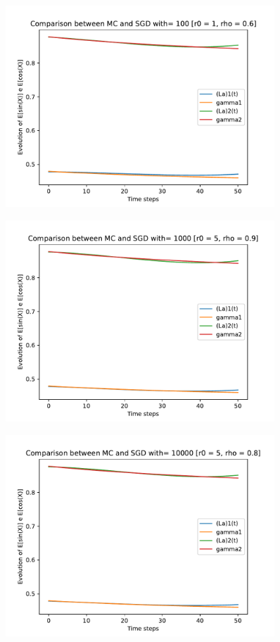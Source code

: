\documentclass[a4paper,11pt,openright]{report}
\begin{document}
\begin{figure}[H]
\centering
\includegraphics[width=0.9\textwidth]{images/graphics T = 0.5/n = 3, M = 100 sine and cosine.pdf}
\end{figure}
\begin{figure}[H]
\centering
\includegraphics[width=0.9\textwidth]{images/graphics T = 0.5/n = 3, M = 1000 sine and cosine.pdf}
\end{figure}
\begin{figure}[H]
\centering
\includegraphics[width=0.9\textwidth]{images/graphics T = 0.5/n = 3, M = 10000 sine and cosine.pdf}
\end{figure}
\newpage
\end{document}
